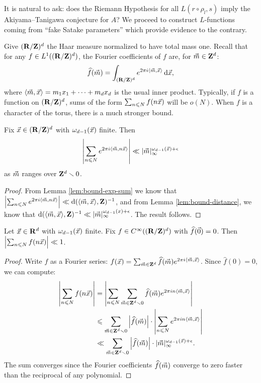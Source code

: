 It is natural to ask: does the Riemann Hypothesis for all $L(r\circ \rho_l,s)$ 
imply the Akiyama--Tanigawa conjecture for $A$? We proceed to construct 
$L$-functions coming from ``fake Satake parameters'' which provide evidence to 
the contrary. 

Give $(\mathbf{R}/\mathbf{Z})^d$ the Haar measure normalized to have total mass one. 
Recall that for any $f\in L^1((\mathbf{R}/\mathbf{Z})^d)$, the Fourier coefficients of $f$ 
are, for $\vec{m}\in \mathbf{Z}^d$: 
\[
	\widehat f(\vec{m}) = \int_{(\mathbf{R}/\mathbf{Z})^d} e^{2\pi i \langle \vec{m},\vec{x}\rangle} \, \mathrm{d} \vec{x} ,
\]
where $\langle \vec{m},\vec{x}\rangle = m_1 x_1 + \cdots + m_d x_d$ is the usual inner 
product. Typically, if $f$ is a function on $(\mathbf{R}/\mathbf{Z})^d$, sums of the form 
$\sum_{n\leqslant N} f(n \vec{x})$ will be $o(N)$. When $f$ is a character of the 
torus, there is a much stronger bound. 

\begin{theorem}
Fix $\vec{x}\in (\mathbf{R}/\mathbf{Z})^d$ with $\omega_{d-1}(\vec{x})$ finite. Then 
\[
	\left| \sum_{n\leqslant N} e^{2\pi i \langle \vec{m}, n \vec{x}\rangle}\right| \ll |\vec{m}|_\infty^{\omega_{d-1}(\vec{x}) + \epsilon} 
\]
as $\vec{m}$ ranges over $\mathbf{Z}^d\smallsetminus 0$. 
\end{theorem}
\begin{proof}
From Lemma \ref{lem:bound-exp-sum} we know that 
$\left| \sum_{n\leqslant N} e^{2\pi i \langle \vec{m}, n \vec{x}\rangle}\right| \ll \mathrm{d}(\langle \vec{m}, \vec{x}\rangle,\mathbf{Z})^{-1}$, 
and from Lemma \ref{lem:bound-distance}, we know that 
$\mathrm{d}(\langle \vec{m},\vec{x}\rangle, \mathbf{Z})^{-1} \ll |\vec{m}|_\infty^{\omega_{d-1}(x)+\epsilon}$. 
The result follows. 
\end{proof}

\begin{theorem}\label{thm:translates-bound-sum}
Let $\vec{x}\in \mathbf{R}^d$ with $\omega_{d-1}(\vec{x})$ finite. Fix 
$f\in C^\infty((\mathbf{R}/\mathbf{Z})^d)$ with $\widehat f(\vec{0})=0$. Then 
$\left| \sum_{n\leqslant N} f(n \vec{x})\right| \ll 1$. 
\end{theorem}
\begin{proof}
Write $f$ as a Fourier series:
$f(\vec{x}) = \sum_{\vec{m}\in \mathbf{Z}^d} \widehat f(\vec{m}) e^{2\pi i \langle \vec{m},\vec{x}\rangle}$. 
Since $\widehat f(0)=0$, we can compute:
\begin{align*}
	\left| \sum_{n\leqslant N} f(n \vec{x})\right| 
		&= \left| \sum_{n\leqslant N} \sum_{\vec{m}\in \mathbf{Z}^d\smallsetminus 0} \widehat f(\vec{m}) e^{2\pi i n \langle \vec{m},\vec{x}\rangle}\right| \\
		&\leqslant \sum_{\vec{m}\in \mathbf{Z}^d\smallsetminus 0} \left|\widehat f(\vec{m})\right|\cdot \left| \sum_{n\leqslant N} e^{2\pi i n \langle \vec{m},\vec{x}\rangle}\right| \\
		&\ll \sum_{\vec{m}\in \mathbf{Z}^d\smallsetminus 0} \left|\widehat f(\vec{m})\right|\cdot |\vec{m}|_\infty^{\omega_{d-1}(\vec{x}) + \epsilon} .
\end{align*}
The sum converges since the Fourier coefficients $\widehat f(\vec{m})$ converge to 
zero faster than the reciprocal of any polynomial. 
\end{proof}

